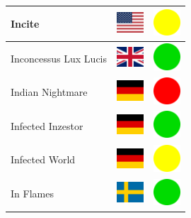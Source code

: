 \documentclass[12pt, a4paper, twoside]{report}
\begin{document}
\begin{center}
\begin{longtable}{|p{5cm}|p{2cm}|p{2cm}|}
			Incite & \includegraphics[width=1cm]{4x3/us} & \includegraphics[width=1cm]{likes/m} \\ \hline
			Inconcessus Lux Lucis & \includegraphics[width=1cm]{4x3/gb} & \includegraphics[width=1cm]{likes/y} \\ \hline
			Indian Nightmare & \includegraphics[width=1cm]{4x3/de} & \includegraphics[width=1cm]{likes/n} \\ \hline
			Infected Inzestor & \includegraphics[width=1cm]{4x3/de} & \includegraphics[width=1cm]{likes/y} \\ \hline
			Infected World & \includegraphics[width=1cm]{4x3/de} & \includegraphics[width=1cm]{likes/m} \\ \hline
			In Flames & \includegraphics[width=1cm]{4x3/se} & \includegraphics[width=1cm]{likes/y} \\ \hline

\end{longtable}
\end{center}
\end{document}
